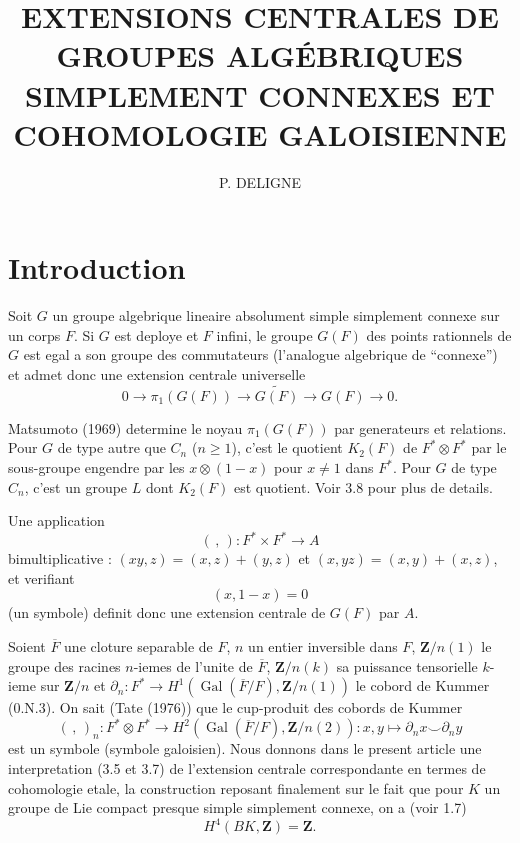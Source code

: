 \documentclass[11pt,a4paper]{article}
\theoremstyle{plain}
\theoremstyle{definition}
\DeclareMathOperator{\Gal}{Gal}
\begin{document}
\title{\textbf{EXTENSIONS CENTRALES DE GROUPES ALG\'EBRIQUES\\SIMPLEMENT CONNEXES ET COHOMOLOGIE GALOISIENNE}}
\author{P. DELIGNE}
\date{}
\maketitle

\tableofcontents

\section*{Introduction}

Soit $G$ un groupe algebrique lineaire absolument simple simplement connexe sur un corps $F$. Si $G$ est deploye et $F$ infini, le groupe $G(F)$ des points rationnels de $G$ est egal a son groupe des commutateurs (l'analogue algebrique de ``connexe'') et admet donc une extension centrale universelle
\begin{equation}\label{0.1}
0 \to \pi_1(G(F)) \to \widetilde{G(F)} \to G(F) \to 0.
\end{equation}

Matsumoto (1969) determine le noyau $\pi_1(G(F))$ par generateurs et relations. Pour $G$ de type autre que $C_n$ ($n \geq 1$), c'est le quotient $K_2(F)$ de $F^* \otimes F^*$ par le sous-groupe engendre par les $x \otimes (1-x)$ pour $x \neq 1$ dans $F^*$. Pour $G$ de type $C_n$, c'est un groupe $L$ dont $K_2(F)$ est quotient. Voir 3.8 pour plus de details.

Une application
\[
(\, , \,) : F^* \times F^* \to A
\]
bimultiplicative : $(xy,z) = (x,z) + (y,z)$ et $(x,yz) = (x,y) + (x,z)$, et verifiant
\begin{equation}\label{0.2}
(x, 1-x) = 0
\end{equation}
(un symbole) definit donc une extension centrale de $G(F)$ par $A$.

Soient $\overline{F}$ une cloture separable de $F$, $n$ un entier inversible dans $F$, $\mathbf{Z}/n(1)$ le groupe des racines $n$-iemes de l'unite de $\overline{F}$, $\mathbf{Z}/n(k)$ sa puissance tensorielle $k$-ieme sur $\mathbf{Z}/n$ et $\partial_n : F^* \to H^1(\Gal(\overline{F}/F), \mathbf{Z}/n(1))$ le cobord de Kummer (0.N.3). On sait (Tate (1976)) que le cup-produit des cobords de Kummer
\begin{equation}\label{0.3}
(\, , \,)_n : F^* \otimes F^* \to H^2(\Gal(\overline{F}/F), \mathbf{Z}/n(2)) : x, y \mapsto \partial_n x \smile \partial_n y
\end{equation}
est un symbole (symbole galoisien). Nous donnons dans le present article une interpretation (3.5 et 3.7) de l'extension centrale correspondante en termes de cohomologie etale, la construction reposant finalement sur le fait que pour $K$ un groupe de Lie compact presque simple simplement connexe, on a (voir 1.7)
\begin{equation}\label{0.4}
H^4(BK, \mathbf{Z}) = \mathbf{Z}.
\end{equation}
\end{document}
